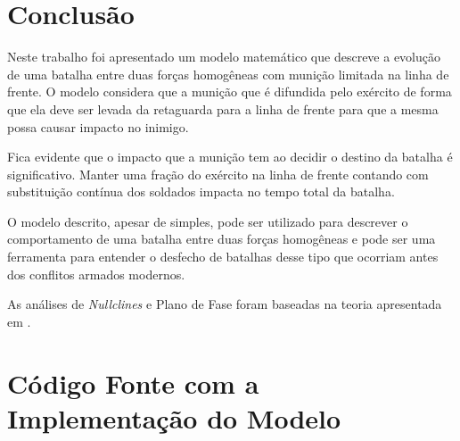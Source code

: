 \documentclass{article}
\begin{document}
\section{Conclusão}

Neste trabalho foi apresentado um modelo matemático que descreve a evolução de uma batalha entre duas forças homogêneas com munição limitada na linha de frente. O modelo considera que a munição que é difundida pelo exército de forma que ela deve ser levada da retaguarda para a linha de frente para que a mesma possa causar impacto no inimigo.

Fica evidente que o impacto que a munição tem ao decidir o destino da batalha é significativo. Manter uma fração do exército na linha de frente contando com substituição contínua dos soldados impacta no tempo total da batalha.

O modelo descrito, apesar de simples, pode ser utilizado para descrever o comportamento de uma batalha entre duas forças homogêneas e pode ser uma ferramenta para entender o desfecho de batalhas desse tipo que ocorriam antes dos conflitos armados modernos.

As análises de \textit{Nullclines} e Plano de Fase foram baseadas na teoria apresentada em \cite{chaos}.







\newpage
\appendix
\section{Código Fonte com a Implementação do Modelo}


\end{document}
